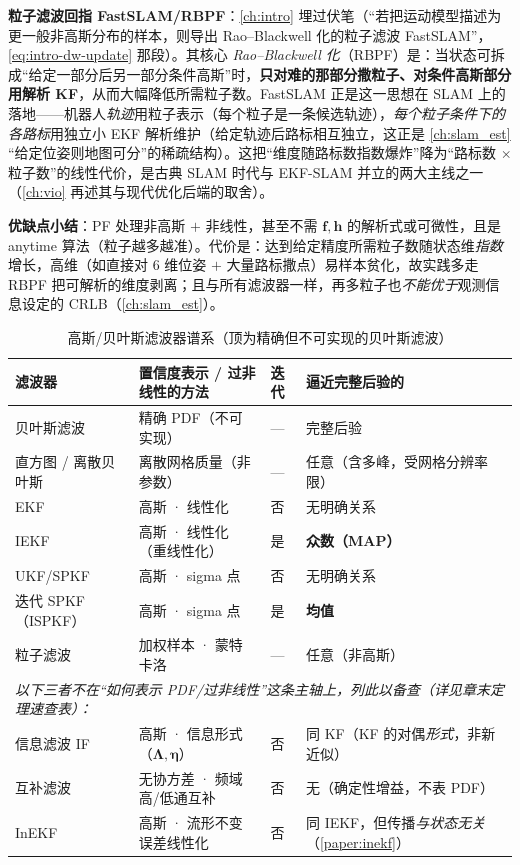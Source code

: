 \begin{insight}
\textbf{粒子滤波回指 FastSLAM/RBPF}：\cref{ch:intro} 埋过伏笔（“若把运动模型描述为更一般非高斯分布的样本，则导出 Rao--Blackwell 化的粒子滤波 FastSLAM”，\cref{eq:intro-dw-update} 那段）。其核心 \emph{Rao--Blackwell 化}（RBPF）是：当状态可拆成“给定一部分后另一部分条件高斯”时，\textbf{只对难的那部分撒粒子、对条件高斯部分用解析 KF}，从而大幅降低所需粒子数。FastSLAM 正是这一思想在 SLAM 上的落地——机器人\emph{轨迹}用粒子表示（每个粒子是一条候选轨迹），\emph{每个粒子条件下的各路标}用独立小 EKF 解析维护（给定轨迹后路标相互独立，这正是 \cref{ch:slam_est} “给定位姿则地图可分”的稀疏结构）。这把“维度随路标数指数爆炸”降为“路标数 $\times$ 粒子数”的线性代价，是古典 SLAM 时代与 EKF-SLAM 并立的两大主线之一（\cref{ch:vio} 再述其与现代优化后端的取舍）。
\end{insight}

\noindent\textbf{优缺点小结}：PF 处理非高斯 $+$ 非线性，甚至不需 $\mathbf{f},\mathbf{h}$ 的解析式或可微性，且是 anytime 算法（粒子越多越准）。代价是：达到给定精度所需粒子数随状态维\emph{指数}增长，高维（如直接对 $6$ 维位姿 $+$ 大量路标撒点）易样本贫化，故实践多走 RBPF 把可解析的维度剥离；且与所有滤波器一样，再多粒子也\emph{不能优于}观测信息设定的 CRLB（\cref{ch:slam_est}）\cite{barfoot2024state}。

\begin{table}[H]\centering\small
\caption{高斯/贝叶斯滤波器谱系（顶为精确但不可实现的贝叶斯滤波）}
\label{tab:filter-taxo}
\begin{tabular}{llll}
\toprule
滤波器 & 置信度表示 / 过非线性的方法 & 迭代 & 逼近完整后验的 \\
\midrule
贝叶斯滤波 & 精确 PDF（不可实现） & — & 完整后验 \\
直方图 / 离散贝叶斯 & 离散网格质量（非参数） & — & 任意（含多峰，受网格分辨率限） \\
EKF & 高斯 · 线性化 & 否 & 无明确关系 \\
IEKF & 高斯 · 线性化（重线性化） & 是 & \textbf{众数（MAP）} \\
UKF/SPKF & 高斯 · sigma 点 & 否 & 无明确关系 \\
迭代 SPKF（ISPKF） & 高斯 · sigma 点 & 是 & \textbf{均值} \\
粒子滤波 & 加权样本 · 蒙特卡洛 & — & 任意（非高斯） \\
\midrule
\multicolumn{4}{l}{\emph{以下三者不在“如何表示 PDF/过非线性”这条主轴上，列此以备查（详见章末定理速查表）：}} \\
信息滤波 IF & 高斯 · 信息形式（$\boldsymbol{\Lambda},\boldsymbol{\eta}$） & 否 & 同 KF（KF 的对偶\emph{形式}，非新近似） \\
互补滤波 & 无协方差 · 频域高/低通互补 & 否 & 无（确定性增益，不表 PDF） \\
InEKF & 高斯 · 流形不变误差线性化 & 否 & 同 IEKF，但传播\emph{与状态无关}（\cref{paper:inekf}） \\
\bottomrule
\end{tabular}
\end{table}

